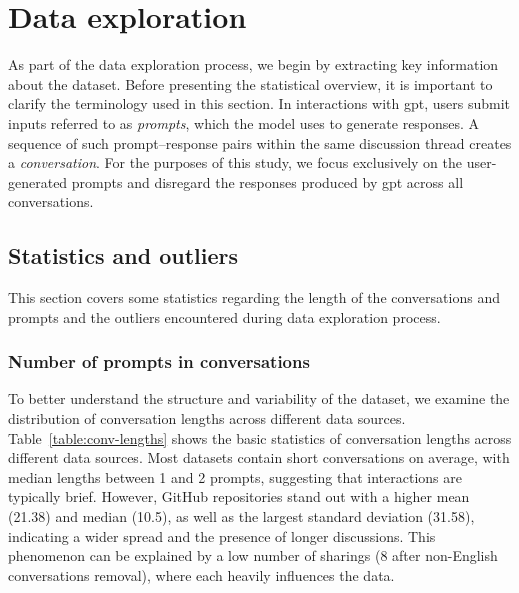 \section{Data exploration}
As part of the data exploration process, we begin by extracting key information about the dataset. Before presenting the statistical overview, it is important to clarify the terminology used in this section. In interactions with \acrshort{gpt}, users submit inputs referred to as \textit{prompts}, which the model uses to generate responses. A sequence of such prompt–response pairs within the same discussion thread creates a \textit{conversation}. For the purposes of this study, we focus exclusively on the user-generated prompts and disregard the responses produced by \acrshort{gpt} across all conversations.

\subsection{Statistics and outliers}
This section covers some statistics regarding the length of the conversations and prompts and the outliers encountered during data exploration process. 

\subsubsection{Number of prompts in conversations}
To better understand the structure and variability of the dataset, we examine the distribution of conversation lengths across different data sources. Table~\ref{table:conv-lengths} shows the basic statistics of conversation lengths across different data sources. Most datasets contain short conversations on average, with median lengths between 1 and 2 prompts, suggesting that interactions are typically brief. However, GitHub repositories stand out with a higher mean (21.38) and median (10.5), as well as the largest standard deviation (31.58), indicating a wider spread and the presence of longer discussions. This phenomenon can be explained by a low number of sharings (8 after non-English conversations removal), where each heavily influences the data.

